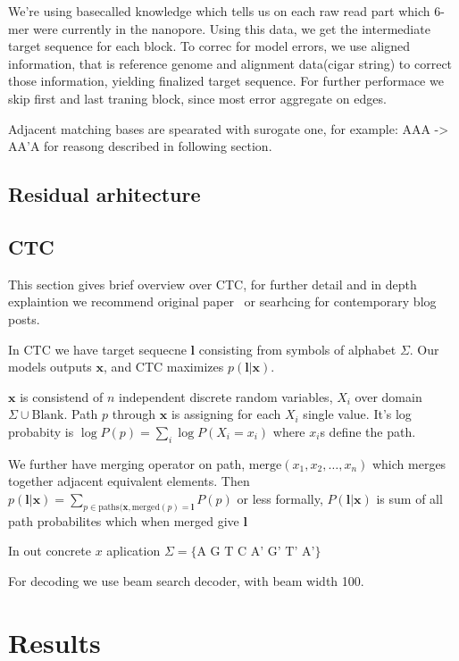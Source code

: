 \documentclass[times, utf8, seminar]{fer}
\begin{document}
We're using basecalled knowledge which tells us on each raw read part which 6-mer were currently in the nanopore. Using this data, we get the intermediate target sequence for each block. To correc for model errors, we use aligned information, that is reference genome and alignment data(cigar string) to correct those information, yielding finalized target sequence. For further performace we skip first and last traning block, since most error aggregate on edges.

Adjacent matching bases are spearated with surogate one, for example: AAA -> AA'A for reasong described in following section.

\section{Residual arhitecture}


\section{CTC}

This section gives brief overview over CTC, for further detail and in depth explaintion we recommend original paper~\cite{graves2006connectionist} or searhcing for contemporary blog posts.

In CTC we have target sequecne $\mathbf{l}$ consisting from symbols of alphabet $\Sigma$. Our models outputs $\mathbf{x}$, and CTC maximizes $p(\mathbf{l}|\mathbf{x})$.

$\mathbf{x}$ is consistend of $n$ independent discrete random variables, $X_i$  over domain $\Sigma \cup \text{Blank}$. Path $p$ through $\mathbf{x}$ is assigning for each $X_i$ single value. It's log probabity is $\log P(p) = \sum_i {\log P(X_i=x_i)}$ where $x_i$s define the path.

We further have merging operator on path, $\text{merge}(x_1, x_2, \ldots, x_n)$ which merges together adjacent equivalent elements. Then $p(\mathbf{l}|\mathbf{x}) = \sum_{p\in\text{paths}(\mathbf{x}, \text{merged}(p) = \mathbf{l}}{P(p)}$ or less formally, $P(\mathbf{l}|\mathbf{x})$ is sum of all path probabilites which when merged give $\mathbf{l}$

In out concrete $x$ aplication $\Sigma = \{\text{A G T C A' G' T' A'}\}$

For decoding we use beam search decoder, with beam width 100.

\chapter{Results}
\end{document}

